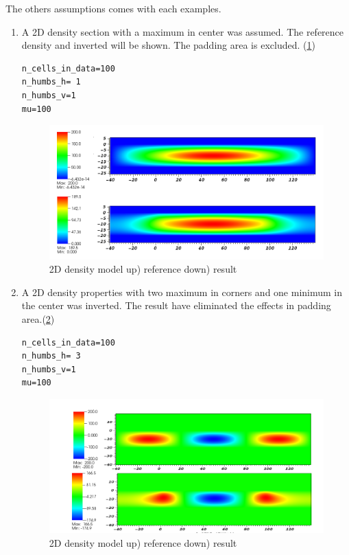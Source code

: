 The others assumptions comes with each examples.
\begin{enumerate}
\item  A 2D density section with a maximum in center was assumed. The reference density and inverted will be shown. The padding area is excluded. (\ref{fig:gravity2D1})

\begin{verbatim}
n_cells_in_data=100
n_humbs_h= 1
n_humbs_v=1
mu=100
\end{verbatim}

\begin{figure}
\centering
\includegraphics[width=\textwidth]{grav2D1.png}
\caption{2D density model up) reference    down) result}
\label{fig:gravity2D1}
\end{figure}


\item A 2D density properties with two maximum in corners and one minimum in the center was inverted. The result have eliminated the effects in padding area.(\ref{fig:gravity2D3}) 

\begin{verbatim}
n_cells_in_data=100
n_humbs_h= 3
n_humbs_v=1
mu=100
\end{verbatim}

\begin{figure}
\centering
\includegraphics[width=\textwidth]{grav2D3.png}
\caption{2D density model up) reference  down) result}
\label{fig:gravity2D3}
\end{figure}


\end{enumerate}
